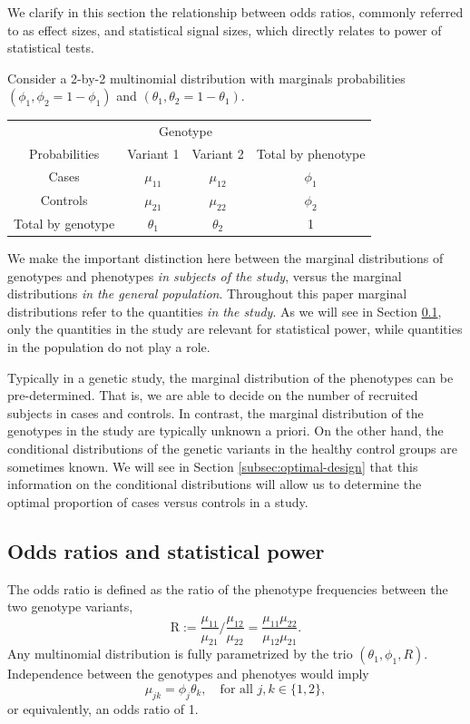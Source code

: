 
We clarify in this section the relationship between odds ratios, commonly referred to as effect sizes, and statistical signal sizes, which directly relates to power of statistical tests.

Consider a 2-by-2 multinomial distribution with marginals probabilities $(\phi_1, \phi_2 = 1-\phi_1)$ and $(\theta_1, \theta_2 = 1-\theta_1)$.
\begin{center}
    \begin{tabular}{cccc}
    \hline
    & \multicolumn{2}{c}{Genotype} \\
    \cline{2-3}
    Probabilities & Variant 1 & Variant 2 & Total by phenotype \\
    \hline
    Cases & $\mu_{11}$ & $\mu_{12}$ & $\phi_1$ \\
    Controls & $\mu_{21}$ & $\mu_{22}$ & $\phi_2$ \\
    Total by genotype & $\theta_1$ & $\theta_2$ & 1 \\
    \hline
    \end{tabular}
\end{center}

We make the important distinction here between the marginal distributions of genotypes and phenotypes \emph{in subjects of the study}, versus the marginal distributions \emph{in the general population}.
Throughout this paper marginal distributions refer to the quantities \emph{in the study}.
As we will see in Section \ref{subsec:odds-and-power}, only the quantities in the study are relevant for statistical power, while quantities in the population do not play a role.

Typically in a genetic study, the marginal distribution of the phenotypes can be pre-determined.
That is, we are able to decide on the number of recruited subjects in cases and controls.
In contrast, the marginal distribution of the genotypes in the study are typically unknown a priori. 
On the other hand, the conditional distributions of the genetic variants in the healthy control groups are sometimes known.
We will see in Section \ref{subsec:optimal-design} that this information on the conditional distributions will allow us to determine the optimal proportion of cases versus controls in a study.

\subsection{Odds ratios and statistical power}
\label{subsec:odds-and-power}

The odds ratio is defined as the ratio of the phenotype frequencies between the two genotype variants,
\begin{equation} \label{eq:odds-ratio}
    \text{R} := \frac{\mu_{11}}{\mu_{21}}\Big/\frac{\mu_{12}}{\mu_{22}}
    = \frac{\mu_{11}\mu_{22}}{\mu_{12}\mu_{21}}.
\end{equation}
Any multinomial distribution is fully parametrized by the trio $(\theta_1, \phi_1, R)$.
Independence between the genotypes and phenotyes would imply
$$
\mu_{jk} = \phi_j\theta_k, \quad \text{for all }j,k \in\{1,2\},
$$
or equivalently, an odds ratio of 1.

